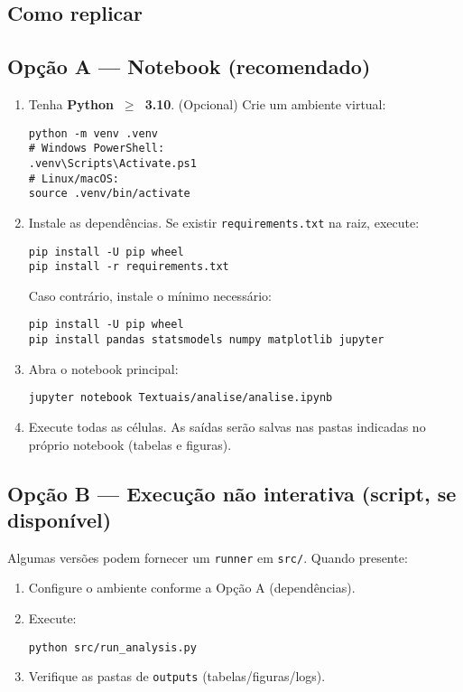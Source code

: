 \begin{apendicesenv}
\section{Como replicar}\label{ap:repo:execucao}

\subsection*{Opção A — Notebook (recomendado)}
\begin{enumerate}
  \item Tenha \textbf{Python~$\geq$~3.10}. (Opcional) Crie um ambiente virtual:
\begin{verbatim}
python -m venv .venv
# Windows PowerShell:
.venv\Scripts\Activate.ps1
# Linux/macOS:
source .venv/bin/activate
\end{verbatim}
  \item Instale as dependências. Se existir \texttt{requirements.txt} na raiz, execute:
\begin{verbatim}
pip install -U pip wheel
pip install -r requirements.txt
\end{verbatim}
  \noindent Caso contrário, instale o mínimo necessário:
\begin{verbatim}
pip install -U pip wheel
pip install pandas statsmodels numpy matplotlib jupyter
\end{verbatim}
  \item Abra o notebook principal:
\begin{verbatim}
jupyter notebook Textuais/analise/analise.ipynb
\end{verbatim}
  \item Execute todas as células. As saídas serão salvas nas pastas indicadas no próprio notebook (tabelas e figuras).
\end{enumerate}

\subsection*{Opção B — Execução não interativa (script, se disponível)}
Algumas versões podem fornecer um \texttt{runner} em \texttt{src/}. Quando presente:
\begin{enumerate}
  \item Configure o ambiente conforme a Opção A (dependências).
  \item Execute:
\begin{verbatim}
python src/run_analysis.py
\end{verbatim}
  \item Verifique as pastas de \texttt{outputs} (tabelas/figuras/logs).
\end{enumerate}


\end{apendicesenv}
